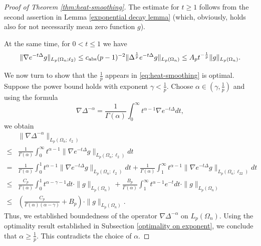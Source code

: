 \documentclass{amsart}
\numberwithin{equation}{section}
\theoremstyle{definition}
\theoremstyle{remark}
\newcommand{\1}{\mathbf 1}
\begin{document}
\begin{proof}[Proof of Theorem \ref{thm:heat-smoothing}] The estimate for $t\geq 1$ follows from the second assertion in Lemma \ref{exponential decay lemma} (which, obviously, holds also for not necessarily mean zero function $g$).

At the same time, for $0<t\leq 1$ we have
$$
\|\nabla e^{-t\Delta}g\|_{L_p(\Omega_{n};\ell_2)}\leq c_{{\rm abs}}(p-1)^{-2}\|\Delta^{\frac1p}e^{-t\Delta}g\|_{L_p(\Omega_{n})}\leq A_pt^{-\frac1p}\|g\|_{L_p(\Omega_{n})}.
$$

We now turn to show that the $\frac{1}{p}$ appears in \eqref{eq:heat-smoothing} is optimal. Suppose the power bound holds with exponent $\gamma<\frac1p.$ Choose $\alpha\in(\gamma,\frac1p)$ and using the formula
$$\nabla\Delta^{-\alpha}=\frac{1}{\Gamma(\alpha)}\int_0^{\infty}t^{\alpha-1}\nabla e^{-t\Delta}dt,$$
we obtain
\begin{align*}
&\|\nabla\Delta^{-\alpha}\|_{L_p(\Omega_{n};\ell_2)}\\
\leq& \frac{1}{\Gamma(\alpha)}\int_0^{\infty}t^{\alpha-1}\|\nabla e^{-t\Delta}g\|_{L_p(\Omega_{n};\ell_2)}dt\\
=&\frac{1}{\Gamma(\alpha)}\int_0^1t^{\alpha-1}\|\nabla e^{-t\Delta}g\|_{L_p(\Omega_{n};\ell_2)}dt+\frac{1}{\Gamma(\alpha)}\int_1^{\infty}t^{\alpha-1}\|\nabla e^{-t\Delta}g\|_{L_p(\Omega_{n};\ell_22)}dt\\
\leq &\frac{C_p}{\Gamma(\alpha)}\int_0^1t^{\alpha-\gamma-1}dt\cdot\|g\|_{L_p(\Omega_{n})}+\frac{B_p}{\Gamma(\alpha)}\int_1^{\infty}t^{\alpha-1}e^{-t}dt\cdot\|g\|_{L_p(\Omega_{n})}\\
\leq &\left(\frac{C_p}{\Gamma(\alpha)(\alpha-\gamma)}+B_p\right)\cdot\|g\|_{L_p(\Omega_{n})}.
\end{align*}
Thus, we established boundedness of the operator $\nabla\Delta^{-\alpha}$ on $L_p(\Omega_{n}).$ Using the optimality result established in Subsection \ref{optimality on exponent}, we conclude that $\alpha\geq\frac1p$. This contradicts the choice of $\alpha.$
\end{proof}
\end{document}
